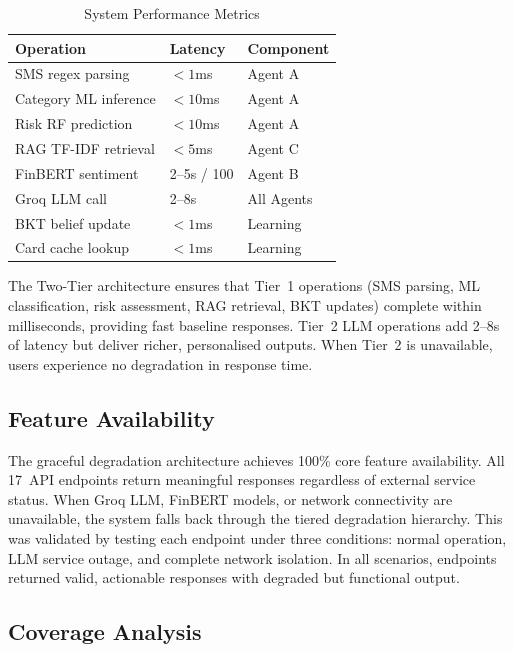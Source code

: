 \documentclass[conference]{IEEEtran}
\begin{document}
\begin{table}[!t]
\centering
\caption{System Performance Metrics}
\label{tab:perf}
\renewcommand{\arraystretch}{1.15}
\footnotesize
\begin{tabular}{p{3.2cm} p{1.8cm} p{2cm}}
\toprule
\textbf{Operation} & \textbf{Latency} & \textbf{Component} \\
\midrule
SMS regex parsing      & $<1$ms           & Agent A \\
Category ML inference  & $<10$ms          & Agent A \\
Risk RF prediction     & $<10$ms          & Agent A \\
RAG TF-IDF retrieval   & $<5$ms           & Agent C \\
FinBERT sentiment      & 2--5s / 100      & Agent B \\
Groq LLM call          & 2--8s            & All Agents \\
BKT belief update      & $<1$ms           & Learning \\
Card cache lookup      & $<1$ms           & Learning \\
\bottomrule
\end{tabular}
\end{table}

The Two-Tier architecture ensures that Tier~1 operations (SMS parsing, ML classification, risk assessment, RAG retrieval, BKT updates) complete within milliseconds, providing fast baseline responses. Tier~2 LLM operations add 2--8s of latency but deliver richer, personalised outputs. When Tier~2 is unavailable, users experience no degradation in response time.

\subsection{Feature Availability}

The graceful degradation architecture achieves 100\% core feature availability. All 17~API endpoints return meaningful responses regardless of external service status. When Groq LLM, FinBERT models, or network connectivity are unavailable, the system falls back through the tiered degradation hierarchy. This was validated by testing each endpoint under three conditions: normal operation, LLM service outage, and complete network isolation. In all scenarios, endpoints returned valid, actionable responses with degraded but functional output.

\subsection{Coverage Analysis}
\end{document}

